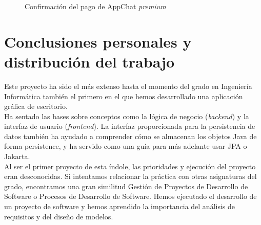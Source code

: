 \documentclass[11pt]{article}
\begin{document}
\begin{figure}[H]
	\centering
	\caption{Confirmación del pago de AppChat \textit{premium}}
	\label{fig:chat-exportadot}
\end{figure}

\clearpage

\section{Conclusiones personales y distribución del trabajo}

Este proyecto ha sido el más extenso hasta el momento del grado en Ingeniería Informática también el primero en el que hemos desarrollado una aplicación gráfica de escritorio.\\

Ha sentado las bases sobre conceptos como la lógica de negocio (\textit{backend}) y la interfaz de usuario (\textit{frontend}). La interfaz proporcionada para la persistencia de datos también ha ayudado a comprender cómo se almacenan los objetos Java de forma persistence, y ha servido como una guía para más adelante usar JPA o Jakarta.\\

Al ser el primer proyecto de esta índole, las prioridades y ejecución del proyecto eran desconocidas. Si intentamos relacionar la práctica con otras asignaturas del grado, encontramos una gran similitud Gestión de Proyectos de Desarrollo de Software o Procesos de Desarrollo de Software. Hemos ejecutado el desarrollo de un proyecto de software y hemos aprendido la importancia del análisis de requisitos y del diseño de modelos.\\
\end{document}
